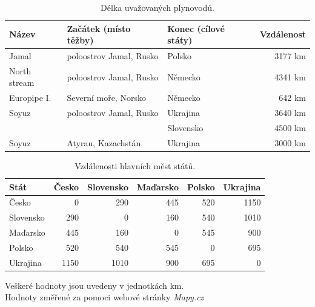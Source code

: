 \documentclass[a4paper,11pt]{article}
\begin{document}
\begin{table}[h!]
\begin{center}
\begin{tabular}{|l|l|l|r|}
    \hline
    Název 			& Začátek (místo těžby)	& Konec (cílové státy) 		& Vzdálenost\\
    \hline 
    Jamal			& poloostrov Jamal, Rusko	& Polsko				& 3177 km\\ 
    North stream\footnotemark 	& poloostrov Jamal, Rusko & Německo	& 4341 km\\
    Europipe I. 		& Severní moře, Norsko 		& Německo  			& 642 km\\
    Soyuz 			& poloostrov Jamal, Rusko 	& Ukrajina 			& 3640 km\\
					&							& Slovensko			& 4500 km\\
	Soyuz 			& Atyrau, Kazachstán	 		& Ukrajina			& 3000 km\\		 
    \hline
\end{tabular}
\caption{Délka uvažovaných plynovodů.} 
\label{plynovody}
\end{center}
\end{table}


\begin{table}[h!]
\begin{center}
\begin{tabular}{|l|r|r|r|r|r|}
    \hline
    Stát 			& Česko		& Slovensko 		& Maďarsko	& Polsko & Ukrajina\\
    \hline 
    Česko			& 0		& 290		& 445	& 520    & 1150\\ 
    Slovensko 		& 290	& 0			& 160	& 540    & 1010\\
    Maďarsko 		& 445	& 160		& 0		& 545 	 & 900\\
    Polsko 			& 520	& 540		& 545 	& 0		 & 695\\
	Ukrajina			& 1150	& 1010		& 900	& 695	 & 0	\\
    \hline
\end{tabular}
\caption{Vzdálenosti hlavních měst států.} 
Veškeré hodnoty jsou uvedeny v jednotkách km.\\
Hodnoty změřené za pomoci webové stránky \textit{Mapy.cz}\footnotemark
\label{staty}
\end{center}
\end{table}
\end{document}
